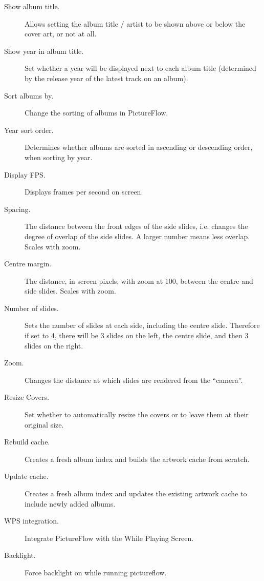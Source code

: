 \begin{description}
  \item[Show album title.] Allows setting the album title / artist to be
  shown above or below the cover art, or not at all.
  \item[Show year in album title.] Set whether a year will be displayed next to each album
  title (determined by the release year of the latest track on an album).
  \item[Sort albums by.] Change the sorting of albums in PictureFlow.
  \item[Year sort order.] Determines whether albums are sorted in ascending or descending
  order, when sorting by year.
  \item[Display FPS.] Displays frames per second on screen.
  \item[Spacing.] The distance between the front edges of the side slides, i.e. changes
  the degree of overlap of the side slides. A larger number means less overlap. Scales with zoom.
  \item[Centre margin.] The distance, in screen pixels, with zoom at 100, between
  the centre and side slides. Scales with zoom.
  \item[Number of slides.] Sets the number of slides at each side, including the
  centre slide. Therefore if set to 4, there will be 3 slides on the left,
  the centre slide, and then 3 slides on the right.
  \item[Zoom.] Changes the distance at which slides are rendered from the ``camera''.
  \item[Resize Covers.] Set whether to automatically resize the covers or to leave
  them at their original size.
  \item[Rebuild cache.] Creates a fresh album index and builds the artwork cache from scratch.
  \item[Update cache.] Creates a fresh album index and updates the existing artwork cache to
  include newly added albums.
  \item[WPS integration.] Integrate PictureFlow with the While Playing Screen.
  \item[Backlight.] Force backlight on while running pictureflow.
\end{description}
